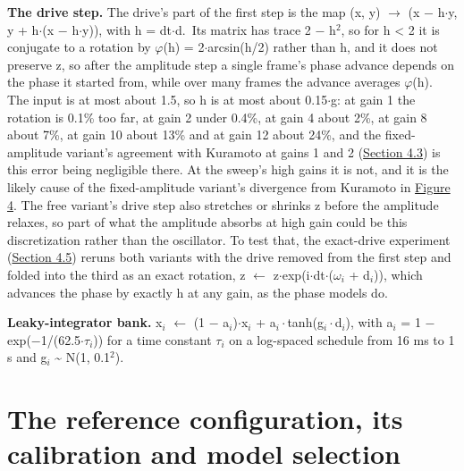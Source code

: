 \documentclass{article}
\makeatletter
\newcommand{\iclr@floatbarrier}{\par\vspace{\z@}%
  \ifx\@deferlist\@empty\else\clearpage\fi}
\let\iclr@section\section
\renewcommand{\section}{\iclr@floatbarrier\iclr@section}
\makeatother
\begin{document}
\textbf{The drive step.} The drive's part of the first step is the map
(x, y) \ensuremath{\to} (x \ensuremath{-} h\ensuremath{\cdot}y, y +
h\ensuremath{\cdot}(x \ensuremath{-} h\ensuremath{\cdot}y)), with h =
dt\ensuremath{\cdot}d.~Its matrix has trace 2 \ensuremath{-}
h\ensuremath{^{2}}, so for h \textless{} 2 it is conjugate to a rotation
by \ensuremath{\varphi}(h) = 2\ensuremath{\cdot}arcsin(h/2) rather than
h, and it does not preserve \textbar z\textbar, so after the amplitude
step a single frame's phase advance depends on the phase it started
from, while over many frames the advance averages
\ensuremath{\varphi}(h). The input is at most about 1.5, so h is at most
about 0.15\ensuremath{\cdot}g: at gain 1 the rotation is 0.1\% too far,
at gain 2 under 0.4\%, at gain 4 about 2\%, at gain 8 about 7\%, at gain
10 about 13\% and at gain 12 about 24\%, and the fixed-amplitude
variant's agreement with Kuramoto at gains 1 and 2
(\hyperref[sec-4-3]{Section 4.3}) is this error being negligible there.
At the sweep's high gains it is not, and it is the likely cause of the
fixed-amplitude variant's divergence from Kuramoto in
\hyperref[fig-fig06-sec4-5-restoring-ceiling-gain]{Figure 4}. The free
variant's drive step also stretches or shrinks \textbar z\textbar{}
before the amplitude relaxes, so part of what the amplitude absorbs at
high gain could be this discretization rather than the oscillator. To
test that, the exact-drive experiment (\hyperref[sec-4-5]{Section 4.5})
reruns both variants with the drive removed from the first step and
folded into the third as an exact rotation, z \ensuremath{\leftarrow}
z\ensuremath{\cdot}exp(i\ensuremath{\cdot}dt\ensuremath{\cdot}(\ensuremath{\omega_{i}}
+ d\ensuremath{_{i}})), which advances the phase by exactly h at any
gain, as the phase models do.

\textbf{Leaky-integrator bank.} x\ensuremath{_{i}}
\ensuremath{\leftarrow} (1 \ensuremath{-}
a\ensuremath{_{i}})\ensuremath{\cdot}x\ensuremath{_{i}} +
a\ensuremath{_{i}\cdot}tanh(g\ensuremath{_{i}\cdot}d\ensuremath{_{i}}),
with a\ensuremath{_{i}} = 1 \ensuremath{-}
exp(\ensuremath{-}1/(62.5\ensuremath{\cdot\tau_{i}})) for a time
constant \ensuremath{\tau_{i}} on a log-spaced schedule from 16 ms to 1
s and g\ensuremath{_{i}} \textasciitilde{} N(1, 0.1\ensuremath{^{2}}).

\section{The reference configuration, its calibration and model
selection}\label{sec-F}
\end{document}
